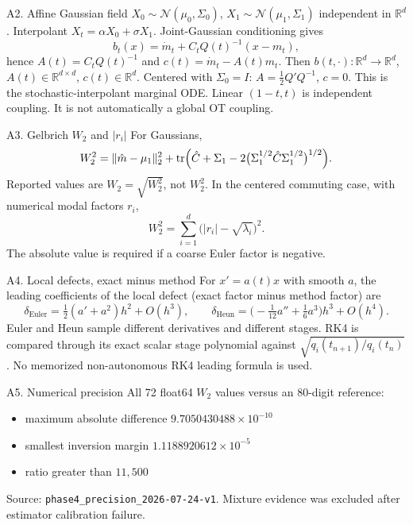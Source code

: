 \documentclass[aspectratio=169,10pt,c]{beamer}
\newcommand{\wtwo}{W_2}
\newcommand{\citefoot}[1]{{\tiny\color{fsgray}\citep{#1}}}
\begin{document}
\begin{frame}{A2. Affine Gaussian field}
  \small
  \(X_0\sim\mathcal{N}(\mu_0,\Sigma_0)\), \(X_1\sim\mathcal{N}(\mu_1,\Sigma_1)\)
  independent in \(\mathbb{R}^d\). Interpolant \(X_t=\alpha X_0+\sigma X_1\).
  Joint-Gaussian conditioning gives
  \[
    b_t(x)=\dot m_t+C_t Q(t)^{-1}(x-m_t),
  \]
  hence \(A(t)=C_t Q(t)^{-1}\) and \(c(t)=\dot m_t-A(t)m_t\).
  Then \(b(t,\cdot):\mathbb{R}^d\to\mathbb{R}^d\), \(A(t)\in\mathbb{R}^{d\times d}\),
  \(c(t)\in\mathbb{R}^d\). Centered with \(\Sigma_0=I\):
  \(A=\tfrac12 Q'Q^{-1}\), \(c=0\).
  This is the stochastic-interpolant marginal ODE.
  Linear \((1-t,t)\) is independent coupling. It is not automatically a global
  OT coupling.
  \citefoot{albergo2025stochastic,gelbrich1990formula}
\end{frame}

\begin{frame}{A3. Gelbrich \texorpdfstring{$\wtwo$}{W2} and \texorpdfstring{$|r_i|$}{|r i|}}
  \small
  For Gaussians,
  \[
    \wtwo^2
    =\|\hat m-\mu_1\|_2^2
    +\mathrm{tr}\Bigl(\hat C+\Sigma_1
    -2\bigl(\Sigma_1^{1/2}\hat C\Sigma_1^{1/2}\bigr)^{1/2}\Bigr).
  \]
  Reported values are \(\wtwo=\sqrt{\wtwo^2}\), not \(\wtwo^2\).
  In the centered commuting case, with numerical modal factors \(r_i\),
  \[
    \wtwo^2=\sum_{i=1}^d \bigl(|r_i|-\sqrt{\lambda_i}\bigr)^2.
  \]
  The absolute value is required if a coarse Euler factor is negative.
  \citefoot{gelbrich1990formula}
\end{frame}

\begin{frame}{A4. Local defects, exact minus method}
  \small
  For \(x'=a(t)x\) with smooth \(a\), the leading coefficients of the local
  defect (exact factor minus method factor) are
  \[
    \delta_{\mathrm{Euler}}=\tfrac12(a'+a^2)h^2+O(h^3),
    \qquad
    \delta_{\mathrm{Heun}}=\bigl(-\tfrac1{12}a''+\tfrac16 a^3\bigr)h^3+O(h^4).
  \]
  Euler and Heun sample different derivatives and different stages.
  RK4 is compared through its exact scalar stage polynomial against
  \(\sqrt{q_i(t_{n+1})/q_i(t_n)}\). No memorized non-autonomous RK4 leading
  formula is used.
\end{frame}

\begin{frame}{A5. Numerical precision}
  \small
  All 72 float64 \(\wtwo\) values versus an 80-digit reference:
  \begin{itemize}
    \item maximum absolute difference \(9.7050430488\times 10^{-10}\)
    \item smallest inversion margin \(1.1188920612\times 10^{-5}\)
    \item ratio greater than \(11{,}500\)
  \end{itemize}
  Source: \texttt{phase4\_precision\_2026-07-24-v1}.
  Mixture evidence was excluded after estimator calibration failure.
\end{frame}
\end{document}
